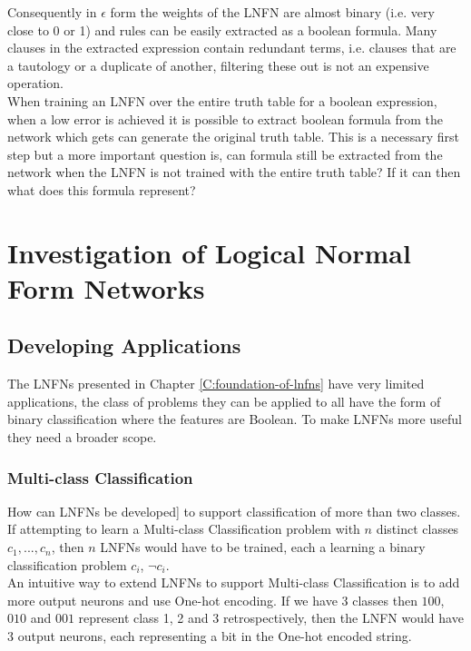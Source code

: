 Consequently in $\epsilon$ form the weights of the LNFN are almost binary (i.e. very close to 0 or 1) and rules can be easily extracted as a boolean formula. Many clauses in the extracted expression contain redundant terms, i.e. clauses that are a tautology or a duplicate of another, filtering these out is not an expensive operation.\\

When training an LNFN over the entire truth table for a boolean expression, when a low error is achieved it is possible to extract boolean formula from the network which gets can generate the original truth table. This is a necessary first step but a more important question is, can formula still be extracted from the network when the LNFN is not trained with the entire truth table? If it can then what does this formula represent?


\chapter{Investigation of Logical Normal Form Networks} \label{C:investigation-of-lnfns}
\section{Developing Applications}
The LNFNs presented in Chapter \ref{C:foundation-of-lnfns} have very limited applications, the class of problems they can be applied to all have the form of binary classification where the features are Boolean. To make LNFNs more useful they need a broader scope.

\subsection{Multi-class Classification}
How can LNFNs be developed] to support classification of more than two classes. If attempting to learn a Multi-class Classification problem with $n$ distinct classes $c_1, ..., c_n$, then $n$ LNFNs would have to be trained, each a learning a binary classification problem $c_i$, $\lnot c_i$.\\

An intuitive way to extend LNFNs to support Multi-class Classification is to add more output neurons and use One-hot encoding. If we have 3 classes then $100$, $010$ and $001$ represent class 1, 2 and 3 retrospectively, then the LNFN would have 3 output neurons, each representing a bit in the One-hot encoded string.\\

